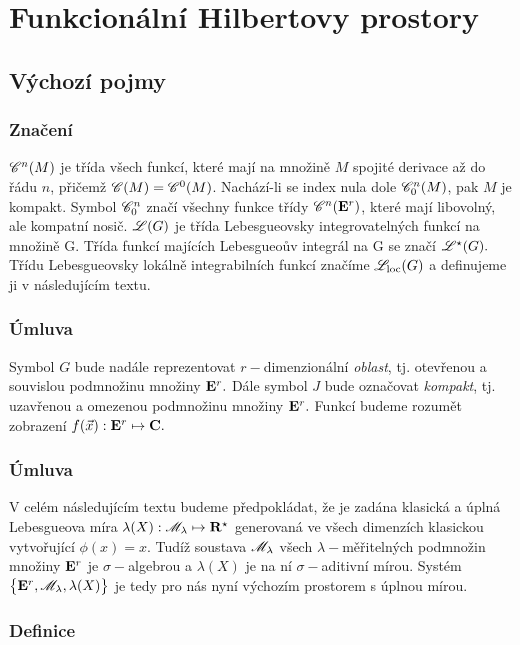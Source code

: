 \chapter{Funkcion\'aln\'i Hilbertovy prostory}

\section{V\'ychoz\'i pojmy}

\subsection{Značení}

$\mathscr{C}^n(M)$ je třída všech funkcí, které mají na množině $M$ spojité derivace až do řádu $n$, přičemž $\mathscr{C}(M)=\mathscr{C}^0(M)$. Nachází-li se index nula dole $\mathscr{C}^n_0(M)$, pak $M$ je kompakt. Symbol $\mathscr{C}^n_0$ značí všechny funkce třídy $\mathscr{C}^n({{\mathbf E}^r})$, které mají libovolný, ale kompatní nosič. ${\mathscr L}(G)$ je třída Lebesgueovsky integrovatelných funkcí na množině G. Třída funkcí majících Lebesgueoův integrál na G se značí ${\mathscr L}^\star(G).$ Třídu Lebesgueovsky lokálně integrabilních funkcí značíme $\mathscr{L}_{\mathrm{loc}}(G)$ a definujeme ji v následujícím textu.

\subsection{Úmluva}

Symbol $G$ bude nadále reprezentovat $r-$dimenzionální \emph{oblast}, tj. otevřenou a souvislou podmnožinu množiny ${{\mathbf E}^r}.$ 
Dále symbol $J$ bude označovat \emph{kompakt}, tj. uzavřenou a omezenou podmnožinu množiny ${{\mathbf E}^r}.$
Funkcí budeme rozumět zobrazení $f({\vec{x}}):{{\mathbf E}^r}\mapsto{\mathbf C}.$


\subsection{Úmluva}

V celém následujícím textu budeme předpokládat, že je zadána klasická a úplná Lebesgueova míra $\lambda(X):\mathscr{M}_\lambda\mapsto {\mathbf R}^\star$ generovaná ve všech dimenzích klasickou vytvořující $\phi(x)=x.$ Tudíž soustava $\mathscr{M}_\lambda$ všech $\lambda-$měřitelných podmnožin množiny ${{\mathbf E}^r}$ je $\sigma-$algebrou a $\lambda(X)$ je na ní $\sigma-$aditivní mírou. Systém $\bigl\{{{\mathbf E}^r},\mathscr{M}_\lambda,\lambda(X)\bigr\}$ je tedy pro nás nyní výchozím prostorem s úplnou mírou.



\subsection{Definice}

